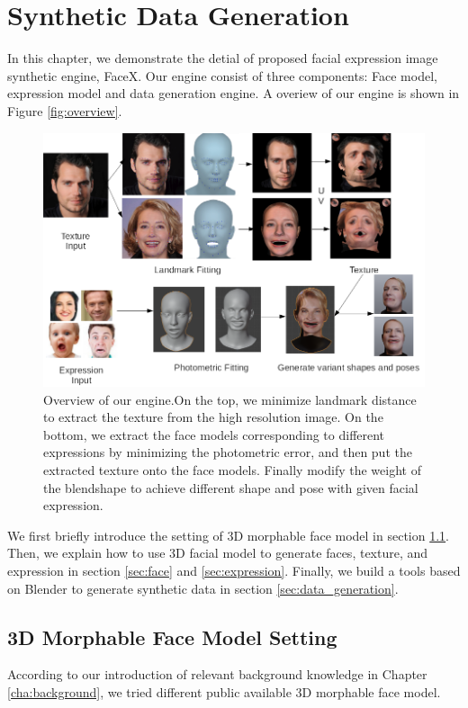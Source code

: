 \chapter{Synthetic Data Generation}
\label{cha:design}
In this chapter, we demonstrate the detial of proposed facial expression image synthetic engine, FaceX. Our engine consist of three components: Face model, expression model and data generation engine. A overiew of our engine is shown in Figure \ref{fig:overview}.

\begin{figure}[H]
    \centering
    \includegraphics[width=\textwidth]{./figs/approach.png}
    \caption{Overview of our engine.On the top, we minimize landmark distance to extract the texture from the high resolution image. On the bottom, we extract the face models corresponding to different expressions by minimizing the photometric error, and then put the extracted texture onto the face models. Finally modify the weight of the blendshape to achieve different shape and pose with given facial expression. }
    \label{fig:approach}
\end{figure}

We first briefly introduce the setting of 3D morphable face model in section \ref{sec:3D}. Then, we explain how to use 3D facial model to generate faces, texture, and expression in section \ref{sec:face} and \ref{sec:expression}. Finally, we build a tools based on Blender \citep{blender} to generate synthetic data in section \ref{sec:data_generation}.

\section{3D Morphable Face Model Setting}
\label{sec:3D}
According to our introduction of relevant background knowledge in Chapter \ref{cha:background}, we tried different public available 3D morphable face model.

